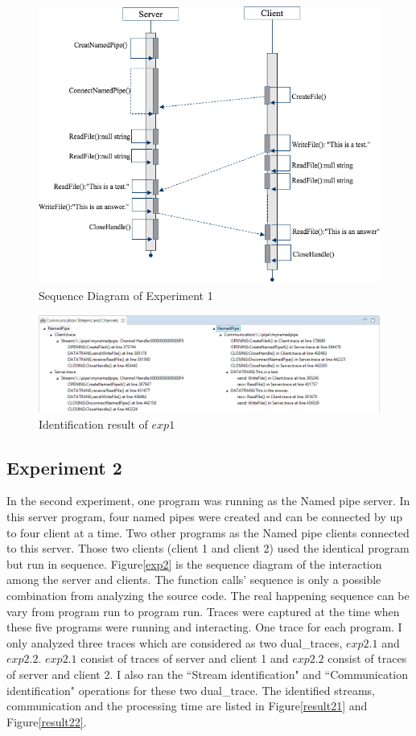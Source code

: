 \begin{figure}[H]
\centerline{\includegraphics[scale=0.7]{Figures/exp1}}
 \caption{Sequence Diagram of Experiment 1}
\label{exp1}
\end{figure}

\begin{figure}[H]
\centerline{\includegraphics[scale=0.65]{Figures/result1}}
 \caption{Identification result of $exp1$}
\label{result1}
\end{figure}

\subsection{Experiment 2}
In the second experiment, one program was running as the Named pipe server. In this server program, four named pipes were created and can be connected by up to four client at a time. Two other programs as the Named pipe clients connected to this server. Those two clients (client 1 and client 2) used the identical program but run in sequence. Figure\ref{exp2} is the sequence diagram of  the interaction among the server and clients. The function calls' sequence is only a possible combination from analyzing the source code. The real happening sequence can be vary from program run to program run. Traces were captured at the time when these five programs were running and interacting. One trace for each program. I only analyzed  three traces which are considered as two dual\_traces, $exp2.1$ and $exp2.2$. $exp2.1$ consist of traces of server and client 1 and $exp2.2$ consist of traces of server and client 2. I also ran the ``Stream identification" and ``Communication identification" operations for these two dual\_trace. The identified streams, communication and the processing time are listed in Figure\ref{result21} and Figure\ref{result22}.

